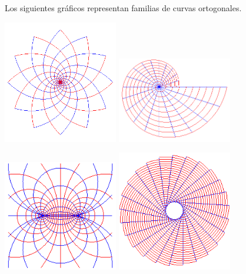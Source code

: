 Los siguientes gráficos representan familias de curvas ortogonales.

\begin{center}
\includegraphics[width=5cm]{images/04_analisis2/flias_ortogonales1.png}
\includegraphics[width=5cm]{images/04_analisis2/flias_ortogonales2.png}

\includegraphics[width=5cm]{images/04_analisis2/flias_ortogonales5.png}
\includegraphics[width=5cm]{images/04_analisis2/flias_ortogonales4.png}


\end{center}
